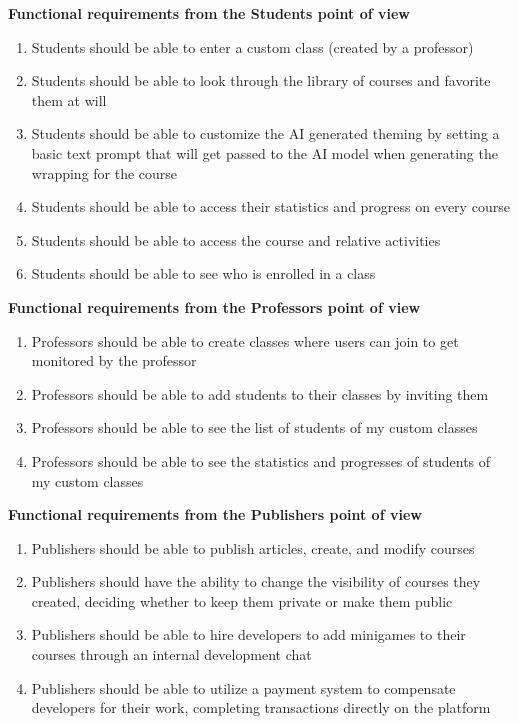 \textbf{Functional requirements from the Students point of view}
\begin{enumerate}[start=8,label={\bfseries FR \arabic*.}]
	\item Students should be able to enter a custom class (created by a professor)
	\item Students should be able to look through the library of courses and favorite them at will
	\item Students should be able to customize the AI generated theming by setting a basic text prompt that will get passed to the AI model when generating the wrapping for the course
	\item Students should be able to access their statistics and progress on every course
	\item Students should be able to access the course and relative activities
	\item Students should be able to see who is enrolled in a class
\end{enumerate}

\textbf{Functional requirements from the Professors point of view}
\begin{enumerate}[start=14,label={\bfseries FR \arabic*.}]
	\item Professors should be able to create classes where users can join to get monitored by the professor
	\item Professors should be able to add students to their classes by inviting them
	\item Professors should be able to see the list of students of my custom classes
	\item Professors should be able to see the statistics and progresses of students of my custom classes
\end{enumerate}

\textbf{Functional requirements from the Publishers point of view}
\begin{enumerate}[start=18,label={\bfseries FR \arabic*.}]
	\item Publishers should be able to publish articles, create, and modify courses
	\item Publishers should have the ability to change the visibility of courses they created, deciding whether to keep them private or make them public
	\item Publishers should be able to hire developers to add minigames to their courses through an internal development chat
	\item Publishers should be able to utilize a payment system to compensate developers for their work, completing transactions directly on the platform
\end{enumerate}

